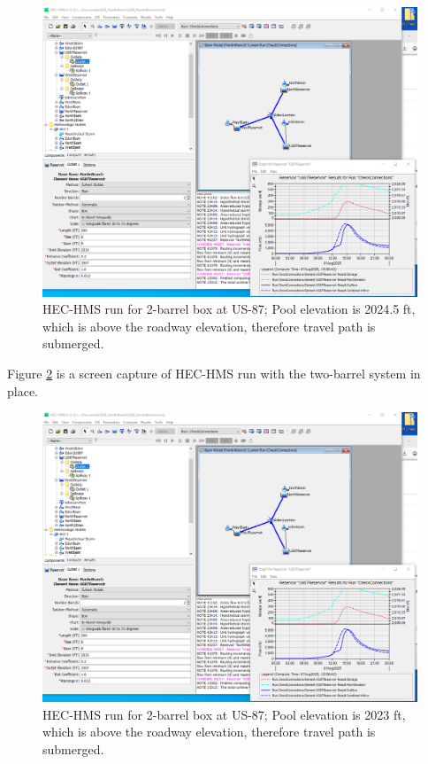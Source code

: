\documentclass[12pt]{article}
\begin{document}
\begin{figure}[h!] %
   \centering
   \includegraphics[width=6in]{2X8by8BoxCulverts.png} 
   \caption{HEC-HMS run for 2-barrel box at US-87; Pool elevation is 2024.5 ft, which is above the roadway elevation, therefore travel path is submerged.}
   \label{fig:2X8by8BoxCulverts}
\end{figure}

\clearpage

Figure \ref{fig:4X8by8BoxCulverts} is a screen capture of HEC-HMS run with the two-barrel system in place.

\begin{figure}[h!] %
   \centering
   \includegraphics[width=6in]{2X8by8BoxCulverts.png} 
   \caption{HEC-HMS run for 2-barrel box at US-87; Pool elevation is 2023 ft, which is above the roadway elevation, therefore travel path is submerged.}
   \label{fig:4X8by8BoxCulverts}
\end{figure}
\end{document}
